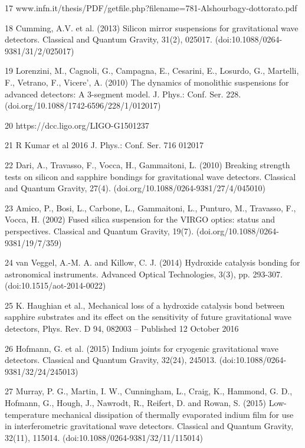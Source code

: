 17 www.infn.it/thesis/PDF/getfile.php?filename=781-Alshourbagy-dottorato.pdf

18 Cumming, A.V. et al. (2013) Silicon mirror suspensions for gravitational wave detectors. Classical and Quantum Gravity, 31(2), 025017. (doi:10.1088/0264-9381/31/2/025017)

19 Lorenzini, M., Cagnoli, G., Campagna, E., Cesarini, E., Losurdo, G., Martelli, F., Vetrano, F., Vicere', A. (2010) The dynamics of monolithic suspensions for advanced detectors: A 3-segment model. J. Phys.: Conf. Ser. 228. (doi.org/10.1088/1742-6596/228/1/012017)

20 https://dcc.ligo.org/LIGO-G1501237

21 R Kumar et al 2016 J. Phys.: Conf. Ser. 716 012017

22 Dari, A., Travasso, F., Vocca, H., Gammaitoni, L. (2010) Breaking strength tests on silicon and sapphire bondings for gravitational wave detectors. Classical and Quantum Gravity, 27(4). (doi.org/10.1088/0264-9381/27/4/045010)

23 Amico, P., Bosi, L., Carbone, L., Gammaitoni, L., Punturo, M., Travasso, F., Vocca, H. (2002) Fused silica suspension for the VIRGO optics: status and perspectives. Classical and Quantum Gravity, 19(7). (doi.org/10.1088/0264-9381/19/7/359)

24 van Veggel, A.-M. A. and Killow, C. J. (2014) Hydroxide catalysis bonding for astronomical instruments. Advanced Optical Technologies, 3(3), pp. 293-307. (doi:10.1515/aot-2014-0022)

25 K. Haughian et al., Mechanical loss of a hydroxide catalysis bond between sapphire substrates and its effect on the sensitivity of future gravitational wave detectors, Phys. Rev. D 94, 082003 – Published 12 October 2016

26 Hofmann, G. et al. (2015) Indium joints for cryogenic gravitational wave detectors. Classical and Quantum Gravity, 32(24), 245013. (doi:10.1088/0264-9381/32/24/245013)

27 Murray, P. G., Martin, I. W., Cunningham, L., Craig, K., Hammond, G. D., Hofmann, G., Hough, J., Nawrodt, R., Reifert, D. and Rowan, S. (2015) Low-temperature mechanical dissipation of thermally evaporated indium film for use in interferometric gravitational wave detectors. Classical and Quantum Gravity, 32(11), 115014. (doi:10.1088/0264-9381/32/11/115014)



